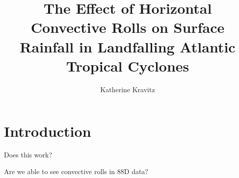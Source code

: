 \documentclass[12pt]{article}
\author{Katherine Kravitz} \title{The Effect of Horizontal Convective Rolls on Surface Rainfall in Landfalling Atlantic Tropical Cyclones}
\begin{document}
\maketitle


\section{Introduction}
Does this work? 

Are we able to see convective rolls in 88D data?
\end{document}
